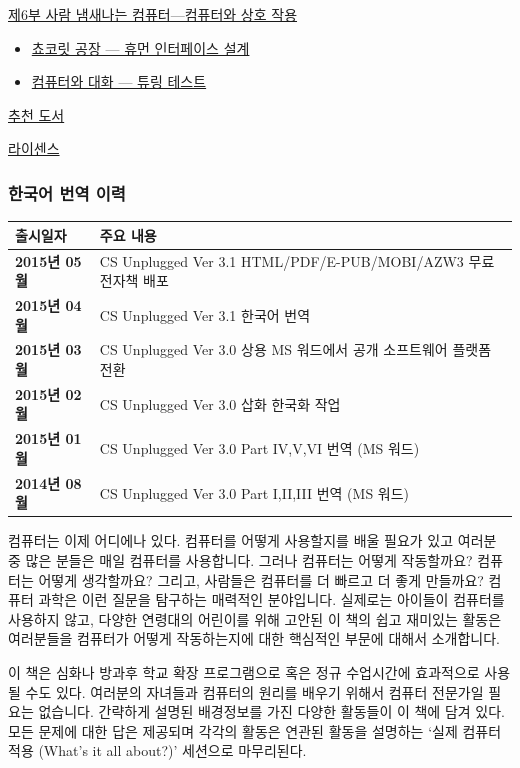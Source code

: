 \documentclass[]{article}
\begin{document}
\hyperref[part-vi]{제6부 사람 냄새나는 컴퓨터---컴퓨터와 상호 작용}

\begin{itemize}
\itemsep1pt\parskip0pt
\item
  \hyperref[human-interface-design]{쵸코릿 공장 --- 휴먼 인터페이스
  설계}
\item
  \hyperref[turing-test]{컴퓨터와 대화 --- 튜링 테스트}
\end{itemize}

\hyperref[reading]{추천 도서}

\hyperref[licenses]{라이센스}

\subsubsection{한국어 번역 이력}

\begin{longtable}[c]{@{}ll@{}}
\toprule
출시일자 & 주요 내용\tabularnewline
\midrule
\endhead
\textbf{2015년 05월} & CS Unplugged Ver 3.1 HTML/PDF/E-PUB/MOBI/AZW3
무료 전자책 배포\tabularnewline
\textbf{2015년 04월} & CS Unplugged Ver 3.1 한국어 번역\tabularnewline
\textbf{2015년 03월} & CS Unplugged Ver 3.0 상용 MS 워드에서 공개
소프트웨어 플랫폼 전환\tabularnewline
\textbf{2015년 02월} & CS Unplugged Ver 3.0 삽화 한국화
작업\tabularnewline
\textbf{2015년 01월} & CS Unplugged Ver 3.0 Part IV,V,VI 번역 (MS
워드)\tabularnewline
\textbf{2014년 08월} & CS Unplugged Ver 3.0 Part I,II,III 번역 (MS
워드)\tabularnewline
\bottomrule
\end{longtable}


컴퓨터는 이제 어디에나 있다. 컴퓨터를 어떻게 사용할지를 배울 필요가 있고
여러분 중 많은 분들은 매일 컴퓨터를 사용합니다. 그러나 컴퓨터는 어떻게
작동할까요? 컴퓨터는 어떻게 생각할까요? 그리고, 사람들은 컴퓨터를 더
빠르고 더 좋게 만들까요? 컴퓨터 과학은 이런 질문을 탐구하는 매력적인
분야입니다. 실제로는 아이들이 컴퓨터를 사용하지 않고, 다양한 연령대의
어린이를 위해 고안된 이 책의 쉽고 재미있는 활동은 여러분들을 컴퓨터가
어떻게 작동하는지에 대한 핵심적인 부문에 대해서 소개합니다.

이 책은 심화나 방과후 학교 확장 프로그램으로 혹은 정규 수업시간에
효과적으로 사용될 수도 있다. 여러분의 자녀들과 컴퓨터의 원리를 배우기
위해서 컴퓨터 전문가일 필요는 없습니다. 간략하게 설명된 배경정보를 가진
다양한 활동들이 이 책에 담겨 있다. 모든 문제에 대한 답은 제공되며 각각의
활동은 연관된 활동을 설명하는 `실제 컴퓨터 적용 (What's it all about?)'
세션으로 마무리된다.
\end{document}
